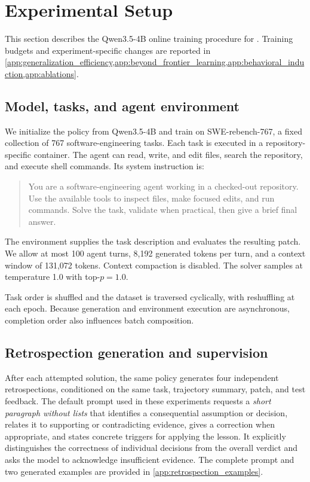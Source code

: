 \section{Experimental Setup}
\label{app:experimental_setup}

This section describes the Qwen3.5-4B online training procedure for
\methodabbr{}. Training budgets and experiment-specific changes are
reported in \cref{app:generalization_efficiency,app:beyond_frontier_learning,app:behavioral_induction,app:ablations}.

\subsection{Model, tasks, and agent environment}

We initialize the policy from Qwen3.5-4B
\citep{qwen2026qwen35fourb} and train on SWE-rebench-767, a fixed
collection of 767 software-engineering tasks. Each task is executed in
a repository-specific container. The
agent can read, write, and edit files, search the repository, and execute
shell commands. Its system instruction is:
\begin{quote}\small
You are a software-engineering agent working in a checked-out repository.
Use the available tools to inspect files, make focused edits, and run commands.
Solve the task, validate when practical, then give a brief final answer.
\end{quote}
The environment supplies the task description and evaluates the resulting
patch. We allow at most 100 agent turns, 8,192 generated tokens per turn,
and a context window of 131,072 tokens. Context compaction is disabled.
The solver samples at temperature 1.0 with top-$p=1.0$.

Task order is shuffled and the dataset is traversed cyclically, with
reshuffling at each epoch. Because generation and environment execution
are asynchronous, completion order also influences batch composition.

\subsection{Retrospection generation and supervision}
\label{app:retrospection_generation}

After each attempted solution, the same policy generates four independent
retrospections, conditioned on the same task, trajectory summary, patch,
and test feedback. The default prompt used in these experiments requests
a \emph{short paragraph without lists} that identifies a consequential
assumption or decision, relates it to supporting or contradicting evidence, gives a correction when
appropriate, and states concrete triggers for applying the lesson.
It explicitly distinguishes the correctness of individual decisions
from the overall verdict and asks the model to acknowledge insufficient
evidence. The complete prompt and two generated examples are provided in
\cref{app:retrospection_examples}.

